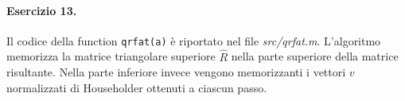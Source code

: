 \paragraph{Esercizio 13.} Il codice della function \verb|qrfat(a)| è riportato nel file \emph{src/qrfat.m}. L'algoritmo memorizza la matrice triangolare superiore $\hat{R}$ nella parte superiore della matrice risultante. Nella parte inferiore invece vengono memorizzanti i vettori $v$ normalizzati di Householder ottenuti a ciascun passo.